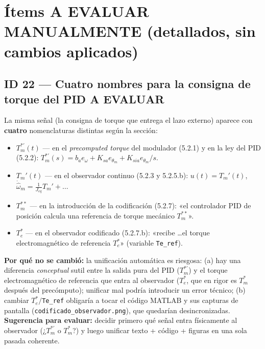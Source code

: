 \documentclass[11pt,a4paper]{article}
\newcommand{\evaluar}{\textcolor{warnorange}{\textbf{A EVALUAR}}}
\begin{document}
\section{Ítems A EVALUAR MANUALMENTE (detallados, sin cambios aplicados)}

\subsection*{ID 22 --- Cuatro nombres para la consigna de torque del PID \evaluar}
La misma señal (la consigna de torque que entrega el lazo externo) aparece con \textbf{cuatro} nomenclaturas distintas según la sección:
\begin{itemize}
  \item $T_m^{\ast\prime}(t)$ --- en el \emph{precomputed torque} del modulador (5.2.1) y en la ley del PID (5.2.2): $T_m^{*\prime}(s)=b_a e_\omega + K_{sa}e_{\theta_m} + K_{sia}e_{\theta_m}/s$.
  \item $T_m'(t)$ --- en el observador continuo (5.2.3 y 5.2.5.b): $u(t)=T_m'(t)$, $\dot{\hat\omega}_m = \frac{1}{J_{eq}}T_m' + \dots$
  \item $T_m^{**}$ --- en la introducción de la codificación (5.2.7): «el controlador PID de posición calcula una referencia de torque mecánico $T_m^{**}$».
  \item $T_e^{*}$ --- en el observador codificado (5.2.7.b): «recibe \dots el torque electromagnético de referencia $T_e^{*}$» (variable \texttt{Te\_ref}).
\end{itemize}
\textbf{Por qué no se cambió:} la unificación automática es riesgosa: (a) hay una diferencia \emph{conceptual} sutil entre la salida pura del PID ($T_m^{*\prime}$) y el torque electromagnético de referencia que entra al observador ($T_e^*$, que en rigor es $T_m^*$ después del precómputo); unificar mal podría introducir un error técnico; (b) cambiar $T_e^*/$\texttt{Te\_ref} obligaría a tocar el código MATLAB y sus capturas de pantalla (\texttt{codificado\_observador.png}), que quedarían desincronizadas. \textbf{Sugerencia para evaluar:} decidir primero qué señal entra físicamente al observador (¿$T_m^{*\prime}$ o $T_m^{*}$?) y luego unificar texto + código + figuras en una sola pasada coherente.
\end{document}
